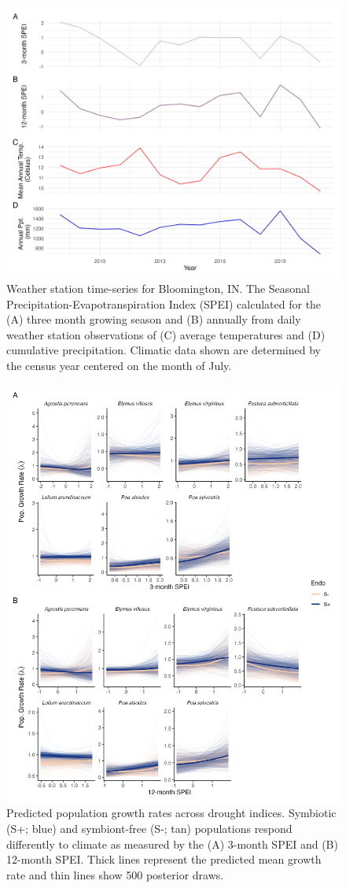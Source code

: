 \documentclass[9pt,twoside,lineno]{pnas-new}
\begin{document}
\begin{figure}
	\centering
	\includegraphics[width=\linewidth]{climate_plot.png}
	\caption{Weather station time-series for Bloomington, IN. The Seasonal Precipitation-Evapotranspiration Index (SPEI) calculated for the (A) three month growing season and (B) annually from daily weather station observations of (C) average temperatures and (D) cumulative precipitation. Climatic data shown are determined by the census year centered on the month of July.}
\end{figure}


\begin{figure}
	\centering
	\includegraphics[width=.7\linewidth]{spei_combo_lambda_plot.png}
	\caption{Predicted population growth rates across drought indices. Symbiotic (S+; blue) and symbiont-free (S-; tan) populations respond differently to climate as measured by the (A) 3-month SPEI and (B) 12-month SPEI. Thick lines represent the predicted mean growth rate and thin lines show 500 posterior draws.}
\end{figure}
\end{document}
